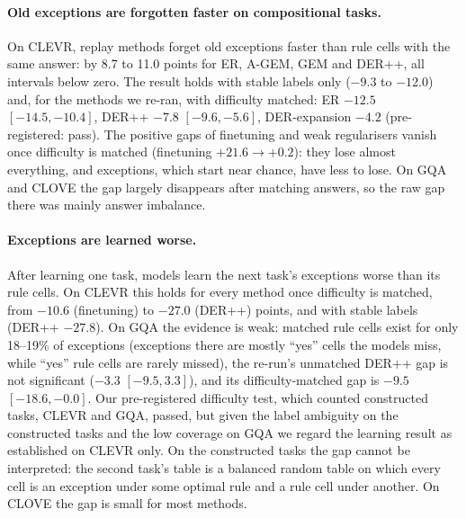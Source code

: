 \paragraph{Old exceptions are forgotten faster on compositional tasks.}
On CLEVR, replay methods forget old exceptions faster than rule cells with the same answer: by 8.7 to 11.0 points for
ER, A-GEM, GEM and DER++, all intervals below zero. The result holds with stable labels only ($-9.3$ to $-12.0$) and,
for the methods we re-ran, with difficulty matched: ER $-12.5$ $[-14.5,-10.4]$, DER++ $-7.8$ $[-9.6,-5.6]$,
DER-expansion $-4.2$ (pre-registered: pass). The positive gaps of finetuning and weak regularisers vanish once
difficulty is matched (finetuning $+21.6\to+0.2$): they lose almost everything, and exceptions, which start near chance,
have less to lose. On GQA and CLOVE the gap largely disappears after matching answers, so the raw gap there was mainly
answer imbalance.

\paragraph{Exceptions are learned worse.}
After learning one task, models learn the next task's exceptions worse than its rule cells. On CLEVR this holds for
every method once difficulty is matched, from $-10.6$ (finetuning) to $-27.0$ (DER++) points, and with stable labels
(DER++ $-27.8$). On GQA the evidence is weak: matched rule cells exist for only 18--19\% of exceptions (exceptions there are mostly ``yes'' cells the models miss, while ``yes'' rule cells are rarely missed), the re-run's unmatched DER++ gap is not significant ($-3.3$ $[-9.5,3.3]$), and its difficulty-matched gap is $-9.5$ $[-18.6,-0.0]$. Our pre-registered difficulty test, which counted constructed tasks, CLEVR and GQA, passed, but given the label ambiguity on the constructed tasks and the low coverage on GQA we regard the learning result as established on CLEVR only. On the
constructed tasks the gap cannot be interpreted: the second task's table is a balanced random table on which every cell
is an exception under some optimal rule and a rule cell under another. On CLOVE the gap is small for most methods.

